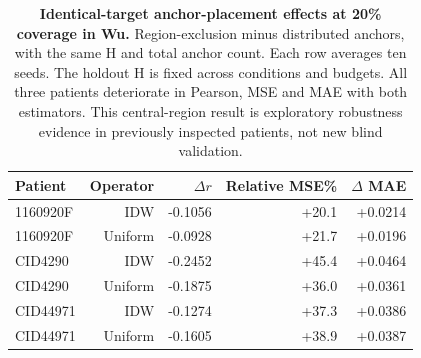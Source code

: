 \begin{table}[!htbp]
\caption{\textbf{Identical-target anchor-placement effects at 20\% coverage in Wu.} Region-exclusion minus distributed anchors, with the same H and total anchor count. Each row averages ten seeds. The holdout H is fixed across conditions and budgets. All three patients deteriorate in Pearson, MSE and MAE with both estimators. This central-region result is exploratory robustness evidence in previously inspected patients, not new blind validation.}
\label{tab:journal_identical}
\centering\footnotesize
\begin{tabular}{@{}lrrrr@{}}
\toprule
Patient & Operator & $\Delta r$ & Relative MSE\% & $\Delta$ MAE \\
\midrule
1160920F & IDW & -0.1056 & +20.1 & +0.0214 \\
1160920F & Uniform & -0.0928 & +21.7 & +0.0196 \\
CID4290 & IDW & -0.2452 & +45.4 & +0.0464 \\
CID4290 & Uniform & -0.1875 & +36.0 & +0.0361 \\
CID44971 & IDW & -0.1274 & +37.3 & +0.0386 \\
CID44971 & Uniform & -0.1605 & +38.9 & +0.0387 \\
\bottomrule
\end{tabular}
\end{table}
\FloatBarrier

